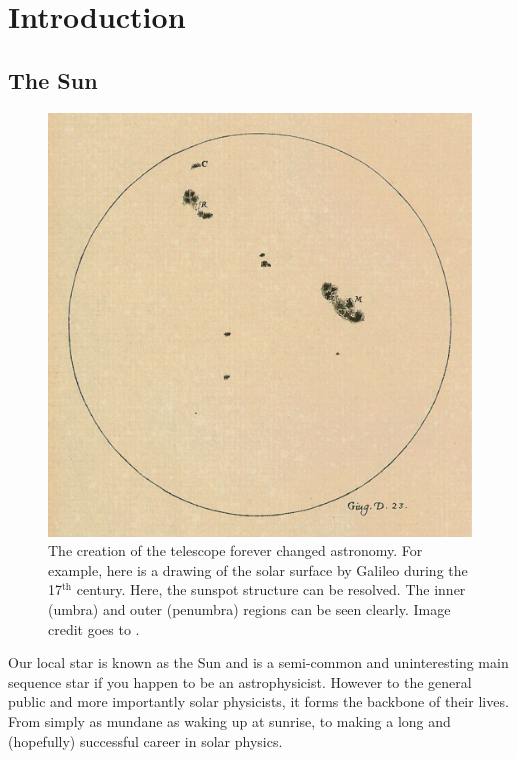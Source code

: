 \graphicspath{{Chapter1/Figs/}}

\chapter{Introduction}
      	
   \vspace*{\fill}\par
   \pagebreak

\section{The Sun}

    \begin{figure}
        \centering
        \includegraphics[width=\textwidth]{23_June_1613.pdf}
        \caption{
                 The creation of the telescope forever changed astronomy.
                 For example, here is a drawing of the solar surface by Galileo during the 17$^{\mathrm{th}}$ century. 
                 Here, the sunspot structure can be resolved.
                 The inner (umbra) and outer (penumbra) regions can be seen clearly.
                 Image credit goes to \cite{galileo}.
               }
        \label{fig:galileo}
    \end{figure}
     
    Our local star is known as the Sun and is a semi-common and uninteresting main sequence star if you happen to be an astrophysicist.
    However to the general public and more importantly solar physicists, it forms the backbone of their lives.
    From simply as mundane as waking up at sunrise, to making a long and (hopefully) successful career in solar physics.
    
